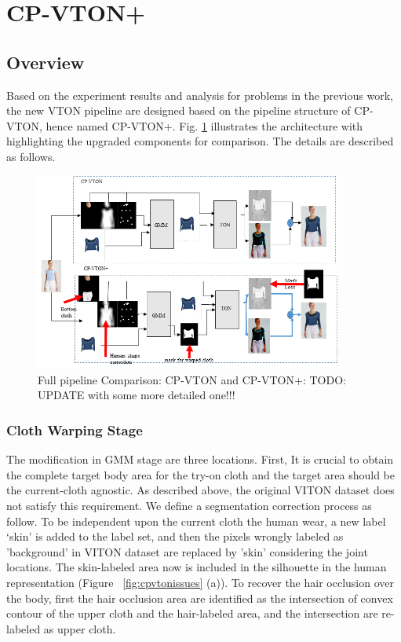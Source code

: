 \section{CP-VTON+} \label{section:cpvton+}

\subsection{Overview} 
Based on the experiment results and analysis for problems in the previous work, the new VTON pipeline are designed based on the pipeline structure of CP-VTON, hence named CP-VTON+. Fig. \ref{fig:piepline} illustrates the architecture with highlighting the upgraded components for comparison. The details are described as follows.

\begin{figure}[t]
\centering
\includegraphics[height=6.5cm, scale=1]{figures/cpvton+pipeline.png}   
\caption{Full pipeline Comparison: CP-VTON and CP-VTON+: TODO: UPDATE with some more detailed one!!!}
\label{fig:piepline}
\end{figure}

\subsubsection{Cloth Warping Stage}

The modification in GMM stage are three locations. 
First, It is crucial to obtain the complete target body area for the try-on cloth and the target area should be the current-cloth agnostic. As described above, the original VITON dataset does not satisfy this requirement. We define a segmentation correction process as follow.  
To be independent upon the current cloth the human wear, a new label ‘skin’ is added to the label set, and then  the pixels wrongly labeled as 'background' in VITON dataset are replaced by 'skin' considering the joint locations. The skin-labeled area now is included in the silhouette in the human representation (Figure  ~\ref{fig:cpvtonissues} (a)).
To recover the hair occlusion over the body, first the hair occlusion area are identified as the intersection of convex contour of the upper cloth and the hair-labeled area, and the intersection are re-labeled as upper cloth.   


